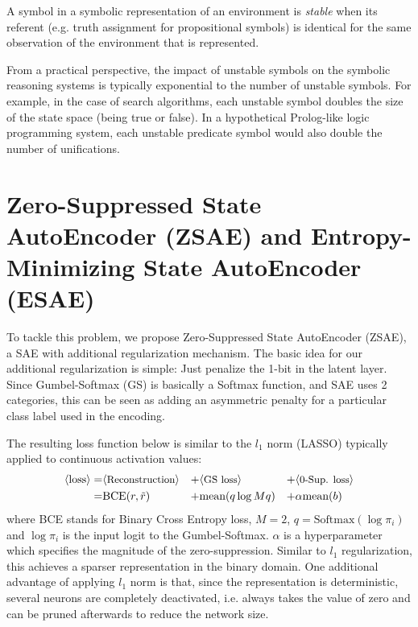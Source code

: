 \begin{defi}
A symbol in a symbolic representation of an environment is \emph{stable}
when its referent (e.g. truth assignment for propositional symbols) is identical
for the same observation of the environment that is represented.
\end{defi}

From a practical perspective, 
the impact of unstable symbols on the symbolic reasoning systems is typically exponential to the number of unstable symbols.
For example, in the case of search algorithms, each unstable symbol doubles the size of the state space (being true or false).
In a hypothetical Prolog-like logic programming system, each unstable predicate symbol would also double the
number of unifications.


\section{Zero-Suppressed State AutoEncoder (ZSAE) and Entropy-Minimizing State AutoEncoder (ESAE)}
\label{zsae}

To tackle this problem, we propose Zero-Suppressed State AutoEncoder (ZSAE),
a SAE with additional regularization mechanism.
The basic idea for our additional regularization is simple: Just penalize the
1-bit in the latent layer. Since Gumbel-Softmax (GS) is basically a Softmax function,
and SAE uses 2 categories, this can be seen as adding an
asymmetric penalty for a particular class label used in the encoding.

The resulting loss function below is similar to the $l_1$ norm (LASSO) typically
applied to continuous activation values:
\begin{align*}
 \brackets{\text{loss}} = & \brackets{\text{\small Reconstruction}} &+ & \brackets{\text{\small GS loss}} &+ & \brackets{\text{\small 0-Sup. loss}} \\ 
 =                        & \text{BCE}(r,\tilde{r})     &+ & \text{mean}(q \log Mq)           &+ & \alpha \text{mean}(b)
\end{align*}
where BCE stands for Binary Cross Entropy loss,
$M=2$, $q=\text{Softmax}(\log \pi_i)$ and $\log \pi_i$ is the input logit to the Gumbel-Softmax.
$\alpha$ is a hyperparameter which specifies the magnitude of the zero-suppression.
Similar to $l_1$ regularization, this achieves a sparser representation in the binary domain.
One additional advantage of applying $l_1$ norm is that, since the representation is deterministic,
several neurons are completely deactivated, i.e. always takes the value of zero
and can be pruned afterwards to reduce the network size.

